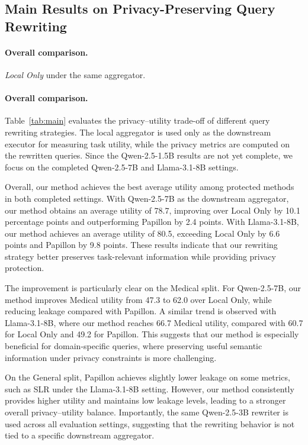 \subsection{Main Results on Privacy-Preserving Query Rewriting}
\label{sec:exp-main}

\paragraph{Overall comparison.}\textit{Local Only} under the same aggregator.

\paragraph{Overall comparison.} Table~\ref{tab:main} evaluates the privacy--utility trade-off of different query rewriting strategies. The local aggregator is used only as the downstream executor for measuring task utility, while the privacy metrics are computed on the rewritten queries. Since the Qwen-2.5-1.5B results are not yet complete, we focus on the completed Qwen-2.5-7B and Llama-3.1-8B settings.

Overall, our method achieves the best average utility among protected methods in both completed settings. With Qwen-2.5-7B as the downstream aggregator, our method obtains an average utility of 78.7, improving over Local Only by 10.1 percentage points and outperforming Papillon by 2.4 points. With Llama-3.1-8B, our method achieves an average utility of 80.5, exceeding Local Only by 6.6 points and Papillon by 9.8 points. These results indicate that our rewriting strategy better preserves task-relevant information while providing privacy protection.

The improvement is particularly clear on the Medical split. For Qwen-2.5-7B, our method improves Medical utility from 47.3 to 62.0 over Local Only, while reducing leakage compared with Papillon. A similar trend is observed with Llama-3.1-8B, where our method reaches 66.7 Medical utility, compared with 60.7 for Local Only and 49.2 for Papillon. This suggests that our method is especially beneficial for domain-specific queries, where preserving useful semantic information under privacy constraints is more challenging.

On the General split, Papillon achieves slightly lower leakage on some metrics, such as SLR under the Llama-3.1-8B setting. However, our method consistently provides higher utility and maintains low leakage levels, leading to a stronger overall privacy--utility balance. Importantly, the same Qwen-2.5-3B rewriter is used across all evaluation settings, suggesting that the rewriting behavior is not tied to a specific downstream aggregator.

